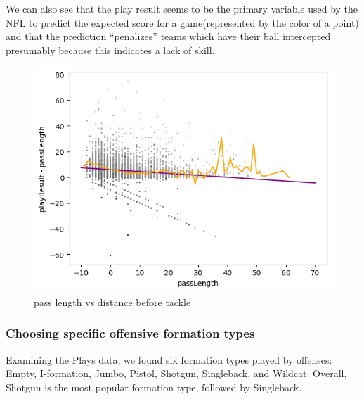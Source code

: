 \documentclass[bibtex, sigconf, hyperref={colorlinks=true,linkcolor=blue,urlcolor=blue}]{acmart}
\begin{document}
We can also see that the play result seems to be the primary variable used by
the NFL to predict the expected score for a game(represented by the color of a
point) and that the prediction ``penalizes'' teams which have their ball
intercepted presumably because this indicates a lack of skill.
\begin{figure}[h]
  \centering
  \includegraphics[width=\linewidth]{result-length}
  \caption{pass length vs distance before tackle}
  \label{fig:pl}
\end{figure}

\subsubsection{Choosing specific offensive formation types}

Examining the Plays data, we found six formation types played by offenses:
Empty, I-formation, Jumbo, Pistol, Shotgun, Singleback, and Wildcat. Overall,
Shotgun is the most popular formation type, followed by Singleback.
\end{document}
